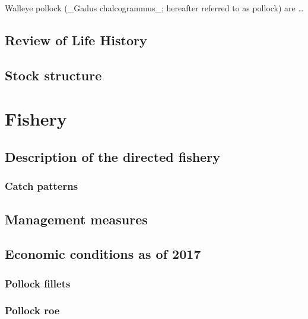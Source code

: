 \documentclass[11pt,]{article}
\begin{document}
Walleye pollock (\_Gadus chalcogrammus\_; hereafter referred to as
pollock) are \ldots{}

\hypertarget{review-of-life-history}{%
\subsection{Review of Life History}\label{review-of-life-history}}

\hypertarget{stock-structure}{%
\subsection{Stock structure}\label{stock-structure}}

\hypertarget{fishery}{%
\section{Fishery}\label{fishery}}

\hypertarget{description-of-the-directed-fishery}{%
\subsection{Description of the directed
fishery}\label{description-of-the-directed-fishery}}

\hypertarget{catch-patterns}{%
\subsubsection{Catch patterns}\label{catch-patterns}}

\hypertarget{management-measures}{%
\subsection{Management measures}\label{management-measures}}

\hypertarget{economic-conditions-as-of-2017}{%
\subsection{Economic conditions as of
2017}\label{economic-conditions-as-of-2017}}

\hypertarget{pollock-fillets}{%
\subsubsection{Pollock fillets}\label{pollock-fillets}}

\hypertarget{pollock-roe}{%
\subsubsection{Pollock roe}\label{pollock-roe}}
\end{document}
